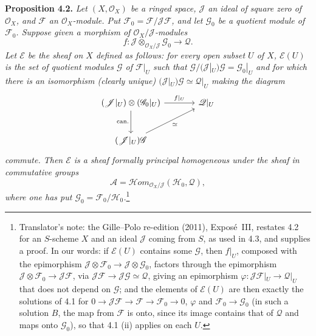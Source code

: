 \medskip
\noindent{}\textbf{Proposition 4.2.}
\textit{Let \((X,\mathscr O_X)\) be a ringed space, \(\mathscr J\) an ideal of
square zero of \(\mathscr O_X\), and \(\mathscr F\) an \(\mathscr O_X\)-module.
Put \(\mathscr F_0=\mathscr F/\mathscr J\mathscr F\), and let \(\mathscr G_0\) be
a quotient module of \(\mathscr F_0\). Suppose given a morphism of
\(\mathscr O_X/\mathscr J\)-modules}
\[
 f:\mathscr J\otimes_{\mathscr O_X/\mathscr J}\mathscr G_0\longrightarrow\mathscr Q.
\]
\textit{Let \(\mathcal E\) be the sheaf on \(X\) defined as follows: for every
open subset \(U\) of \(X\), \(\mathcal E(U)\) is the set of quotient modules
\(\mathscr G\) of \(\mathscr F|_U\) such that
\(\mathscr G/(\mathscr J|_U)\mathscr G=\mathscr G_0|_U\) and for which there is
an isomorphism \textup{(}clearly unique\textup{)}
\((\mathscr J|_U)\mathscr G\simeq\mathscr Q|_U\) making the diagram}
\[
\begin{tikzcd}[column sep=large,row sep=large]
 (\mathscr J|_U)\otimes(\mathscr G_0|_U)
   \arrow[r,"f|_U"]
   \arrow[d,"\mathrm{can.}"']
 &
 \mathscr Q|_U
 \\
 (\mathscr J|_U)\mathscr G
   \arrow[ur,"\simeq"']
 &
\end{tikzcd}
\]
\textit{commute. Then \(\mathcal E\) is a sheaf formally principal homogeneous
under the sheaf in commutative groups}
\[
 \mathscr A=\mathscr{H}om_{\mathscr O_X/\mathscr J}(\mathscr H_0,\mathscr Q),
\]
\textit{where one has put \(\mathscr G_0=\mathscr F_0/\mathscr H_0\).}\footnote{Translator's note: the Gille--Polo re-edition (2011), Exposé~III,
restates 4.2 for an \(S\)-scheme \(X\) and an ideal \(\mathscr J\) coming from
\(S\), as used in 4.3, and supplies a proof. In our words: if \(\mathcal E(U)\)
contains some \(\mathscr G\), then \(f|_U\), composed with the epimorphism
\(\mathscr J\otimes\mathscr F_0\to\mathscr J\otimes\mathscr G_0\), factors
through the epimorphism \(\mathscr J\otimes\mathscr F_0\to\mathscr J\mathscr F\),
via \(\mathscr J\mathscr F\to\mathscr J\mathscr G\simeq\mathscr Q\), giving
an epimorphism \(\varphi\colon\mathscr J\mathscr F|_U\to\mathscr Q|_U\) that
does not depend on \(\mathscr G\); and the elements of \(\mathcal E(U)\) are
then exactly the solutions of 4.1 for
\(0\to\mathscr J\mathscr F\to\mathscr F\to\mathscr F_0\to0\), \(\varphi\) and
\(\mathscr F_0\to\mathscr G_0\) (in such a solution \(B\), the map from
\(\mathscr F\) is onto, since its image contains that of \(\mathscr Q\) and maps
onto \(\mathscr G_0\)), so that 4.1 (ii) applies on each \(U\).}

